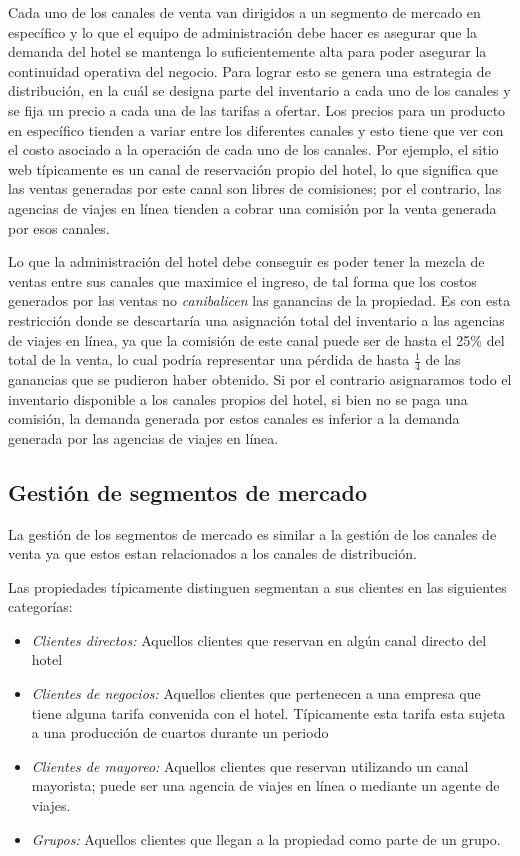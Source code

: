 Cada uno de los canales de venta van dirigidos a un segmento de mercado en específico y lo que el equipo de administración debe hacer es asegurar que la demanda del hotel se mantenga lo suficientemente alta para poder asegurar la continuidad operativa del negocio. Para lograr esto se genera una estrategia de distribución, en la cuál se designa parte del inventario a cada uno de los canales y se fija un precio a cada una de las tarifas a ofertar. Los precios para un producto en específico tienden a variar entre los diferentes canales y esto tiene que ver con el costo asociado a la operación de cada uno de los canales. Por ejemplo, el sitio web típicamente es un canal de reservación propio del hotel, lo que significa que las ventas generadas por este canal son libres de comisiones; por el contrario, las agencias de viajes en línea tienden a cobrar una comisión por la venta generada por esos canales.

Lo que la administración del hotel debe conseguir es poder tener la mezcla de ventas entre sus canales que maximice el ingreso, de tal forma que los costos generados por las ventas no \emph{canibalicen} las ganancias de la propiedad. Es con esta restricción donde se descartaría una asignación total del inventario a las agencias de viajes en línea, ya que la comisión de este canal puede ser de hasta el 25\% del total de la venta, lo cual podría representar una pérdida de hasta $\frac{1}{4}$ de las ganancias que se pudieron haber obtenido. Si por el contrario asignaramos todo el inventario disponible a los canales propios del hotel, si bien no se paga una comisión, la demanda generada por estos canales es inferior a la demanda generada por las agencias de viajes en línea.

\subsection*{Gestión de segmentos de mercado}

La gestión de los segmentos de mercado es similar a la gestión de los canales de venta ya que estos estan relacionados a los canales de distribución. 

Las propiedades típicamente distinguen segmentan a sus clientes en las siguientes categorías:

\begin{itemize}
  \item \emph{Clientes directos:} Aquellos clientes que reservan en algún canal directo del hotel
  \item \emph{Clientes de negocios:} Aquellos clientes que pertenecen a una empresa que tiene alguna tarifa convenida con el hotel. Típicamente esta tarifa esta sujeta a una producción de cuartos durante un periodo
  \item \emph{Clientes de mayoreo:} Aquellos clientes que reservan utilizando un canal mayorista; puede ser una agencia de viajes en línea o mediante un agente de viajes.
  \item \emph{Grupos:} Aquellos clientes que llegan a la propiedad como parte de un grupo.
\end{itemize}

